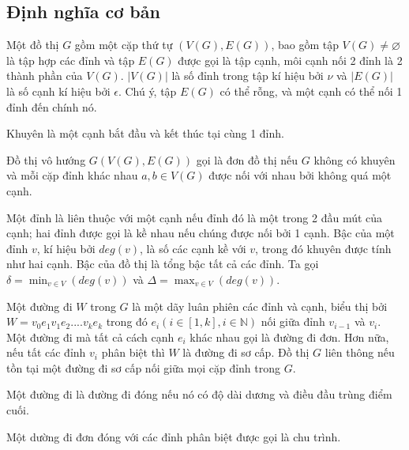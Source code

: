 \subsection{Định nghĩa cơ bản}


\begin{definition}[Đồ thị]
    Một đồ thị $G$ gồm một cặp thứ tự $(V(G),E(G))$, bao gồm tập $V(G) \neq \varnothing $ là tập hợp các đỉnh và tập $E(G)$ được gọi là tập cạnh,
    môi cạnh nối 2 đỉnh là 2 thành phần của $V(G)$.
    $|V(G)|$ là số đỉnh trong tập kí hiệu bởi $\nu$ và $|E(G)|$ là số cạnh kí hiệu bởi $\epsilon$.
    Chú ý, tập $E(G)$ có thể rỗng, và một cạnh có thể nối 1 đỉnh đến chính nó.
\end{definition}

\begin{definition}[Khuyên]
    Khuyên là một cạnh bắt đầu và kết thúc tại cùng 1 đỉnh.
\end{definition}

\begin{definition}
    Đồ thị vô hướng $G(V(G),E(G))$ gọi là đơn đồ thị nếu $G$ không có khuyên và mỗi cặp đỉnh khác nhau $a,b \in V(G)$ được nối với nhau bởi không quá một cạnh.
\end{definition}

\begin{definition}
    Một đỉnh là liên thuộc với một cạnh nếu đỉnh đó là một trong 2 đầu mút của cạnh; hai đỉnh được gọi là kề nhau nếu chúng được nối bởi 1 cạnh.
    Bậc của một đỉnh $v$, kí hiệu bởi $deg(v)$, là số các cạnh kề với $v$, trong đó khuyên được tính như hai cạnh. Bậc của đồ thị là tổng bậc tất cả các đỉnh.
    Ta gọi $\delta = \displaystyle\min_{v \in V}(deg (v))$ và $\Delta = \displaystyle\max_{v \in V}(deg (v))$.
\end{definition}

\begin{definition}
    Một đường đi $W$ trong $G$ là một dãy luân phiên các đỉnh và cạnh, biểu thị bởi $W=v_0e_1v_1e_2....v_ke_k$ trong đó $e_i (i \in [1,k], i \in \mathbb{N})$ nối giữa đỉnh $v_{i-1}$ và $v_i$.
    Một đường đi mà tất cả cách cạnh $e_i$ khác nhau gọi là đường đi đơn.
    Hơn nữa, nếu tất các đỉnh $v_i$ phân biệt thì $W$ là đường đi sơ cấp.
    Đồ thị $G$ liên thông nếu tồn tại một đường đi sơ cấp nối giữa mọi cặp đỉnh trong $G$.

    Một đường đi là đường đi đóng nếu nó có độ dài dương và điều đầu trùng điểm cuối.

    Một dường đi đơn đóng với các đỉnh phân biệt được gọi là chu trình.
\end{definition}

